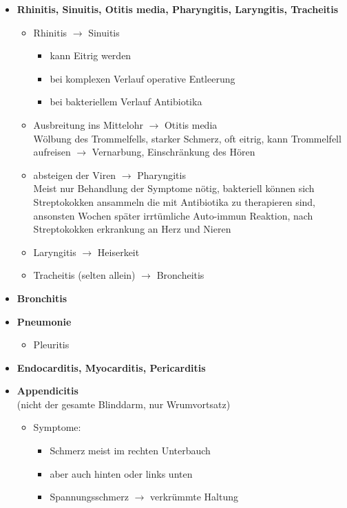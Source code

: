 		\begin{itemize}
			\item \textbf{Rhinitis, Sinuitis, Otitis media, Pharyngitis, Laryngitis, Tracheitis}
				\begin{itemize}
					\item Rhinitis $\rightarrow$ Sinuitis
						\begin{itemize}
							\item kann Eitrig werden
							\item bei komplexen Verlauf operative Entleerung
							\item bei bakteriellem Verlauf Antibiotika
						\end{itemize}
					\item Ausbreitung ins Mittelohr $\rightarrow$ Otitis media\\
						Wölbung des Trommelfells, starker Schmerz, oft eitrig, kann Trommelfell aufreisen $\rightarrow$ Vernarbung, Einschränkung des Hören
					\item absteigen der Viren $\rightarrow$ Pharyngitis\\
						Meist nur Behandlung der Symptome nötig, bakteriell können sich Streptokokken ansammeln die mit Antibiotika zu therapieren sind, ansonsten Wochen später irrtümliche Auto-immun Reaktion, nach Streptokokken erkrankung an Herz und Nieren
					\item Laryngitis $\rightarrow$ Heiserkeit
					\item Tracheitis (selten allein) $\rightarrow$ Broncheitis
				\end{itemize}
			\item \textbf{Bronchitis}
			\item \textbf{Pneumonie}
				\begin{itemize}
					\item Pleuritis
				\end{itemize}
			\item \textbf{Endocarditis, Myocarditis, Pericarditis}
	\pagebreak
			\item \textbf{Appendicitis}\\
				(nicht der gesamte Blinddarm, nur Wrumvortsatz)
				\begin{itemize}
					\item Symptome:
						\begin{itemize}
						 	\item Schmerz meist im rechten Unterbauch
						 	\item aber auch hinten oder links unten
						 	\item Spannungsschmerz $\rightarrow$ verkrümmte Haltung

\end{itemize}
\end{itemize}
\end{itemize}
